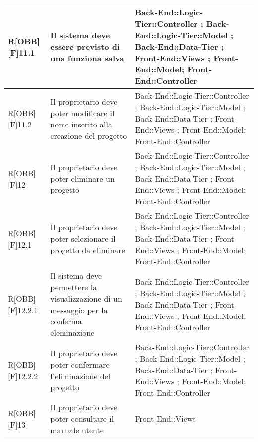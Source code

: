 	\begin{table}
		\begin{tabular}{|p{}|p{}|p{}|}
			\midrule
			
			R[OBB][F]11.1 & Il sistema deve essere previsto di una funziona salva & Back-End::Logic-Tier::Controller ; Back-End::Logic-Tier::Model ; Back-End::Data-Tier ; Front-End::Views ; Front-End::Model; Front-End::Controller  \\ \midrule
			R[OBB][F]11.2 & Il proprietario deve poter modificare il nome inserito alla creazione del progetto & Back-End::Logic-Tier::Controller ; Back-End::Logic-Tier::Model ; Back-End::Data-Tier ; Front-End::Views ; Front-End::Model; Front-End::Controller  \\ \midrule
			R[OBB][F]12 & Il proprietario deve poter eliminare un progetto & Back-End::Logic-Tier::Controller ; Back-End::Logic-Tier::Model ; Back-End::Data-Tier ; Front-End::Views ; Front-End::Model; Front-End::Controller  \\ \midrule
			R[OBB][F]12.1 & Il proprietario deve poter selezionare il progetto da eliminare & Back-End::Logic-Tier::Controller ; Back-End::Logic-Tier::Model ; Back-End::Data-Tier ; Front-End::Views ; Front-End::Model; Front-End::Controller  \\ \midrule
			R[OBB][F]12.2.1 & Il sistema deve permettere la visualizzazione di un messaggio per la conferma eleminazione & Back-End::Logic-Tier::Controller ; Back-End::Logic-Tier::Model ; Back-End::Data-Tier ; Front-End::Views ; Front-End::Model; Front-End::Controller \\ \midrule
			R[OBB][F]12.2.2 & Il proprietario deve poter confermare l'eliminazione del progetto  & Back-End::Logic-Tier::Controller ; Back-End::Logic-Tier::Model ; Back-End::Data-Tier ; Front-End::Views ; Front-End::Model; Front-End::Controller  \\ \midrule
			R[OBB][F]13 & Il proprietario deve poter consultare il manuale utente & Front-End::Views \\ 
				
		\bottomrule
	\end{tabular}
	\end{table}
	\newpage